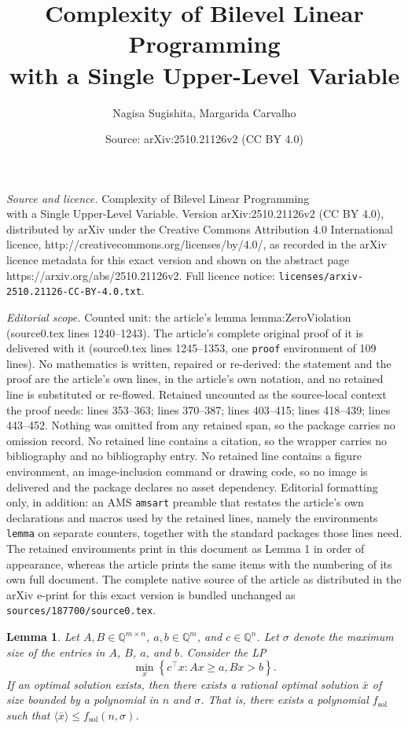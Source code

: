 \documentclass[10pt,a4paper]{amsart}
\title{Complexity of Bilevel Linear Programming\\with a Single Upper-Level Variable}
\author{Nagisa Sugishita, Margarida Carvalho}
\date{Source: arXiv:2510.21126v2 (CC BY 4.0)}
\newtheorem{lemma}{Lemma}
\newcommand{\ConstraintSense}{\MacroColor{\ge}}
\newcommand{\EncodingSize}{size}
\newcommand{\MacroColor}[1]{#1}
\newcommand{\NConstraints}{\MacroColor{m}}
\newcommand{\NVariables}{\MacroColor{n}}
\newcommand{\Size}[1]{\langle#1\rangle}
\newcommand{\SolutionSizeEstimate}{\MacroColor{f_{\mathrm{sol}}}}
\newcommand{\StrictConstraintSense}{\MacroColor{>}}
\begin{document}
\maketitle

\noindent\emph{Source and licence.} Complexity of Bilevel Linear Programming\\with a Single Upper-Level Variable. Version arXiv:2510.21126v2 (CC BY 4.0), distributed by arXiv under the Creative Commons Attribution 4.0 International licence, http://creativecommons.org/licenses/by/4.0/, as recorded in the arXiv licence metadata for this exact version and shown on the abstract page https://arxiv.org/abs/2510.21126v2. Full licence notice: \texttt{licenses/arxiv-2510.21126-CC-BY-4.0.txt}.\par\smallskip

\noindent\textit{Editorial scope.} Counted unit: the article's lemma lemma:ZeroViolation (source0.tex lines 1240--1243). The article's complete original proof of it is delivered with it (source0.tex lines 1245--1353, one \texttt{proof} environment of 109 lines). No mathematics is written, repaired or re-derived: the statement and the proof are the article's own lines, in the article's own notation, and no retained line is substituted or re-flowed.  Retained uncounted as the source-local context the proof needs: lines 353--363; lines 370--387; lines 403--415; lines 418--439; lines 443--452.  Nothing was omitted from any retained span, so the package carries no omission record.  No retained line contains a citation, so the wrapper carries no bibliography and no bibliography entry.  No retained line contains a figure environment, an image-inclusion command or drawing code, so no image is delivered and the package declares no asset dependency.  Editorial formatting only, in addition: an AMS \texttt{amsart} preamble that restates the article's own declarations and macros used by the retained lines, namely the environments \texttt{lemma} on separate counters, together with the standard packages those lines need.  The retained environments print in this document as Lemma 1 in order of appearance, whereas the article prints the same items with the numbering of its own full document.  The complete native source of the article as distributed in the arXiv e-print for this exact version is bundled unchanged as \texttt{sources/187700/source0.tex}.
\begin{lemma}
\label{lemma:estimate-of-primal-linear-inequality}
Let $A, B \in \mathbb{Q}^{\NConstraints \times \NVariables}$, $a, b \in \mathbb{Q}^{\NConstraints}$, and $c \in \mathbb{Q}^{\NVariables}$.  
Let $\sigma$ denote the maximum \EncodingSize{} of the entries in $A$, $B$, $a$, and $b$.  
Consider the LP
\[
\min_{x} \left\{ c^{\top} x : A x \ConstraintSense a, B x \StrictConstraintSense b \right\}.
\]
If an optimal solution exists, then there exists a rational optimal solution $\bar{x}$ of size bounded by a polynomial in $\NVariables$ and $\sigma$.  
That is, there exists a polynomial $\SolutionSizeEstimate$ such that $\Size{\bar{x}} \le \SolutionSizeEstimate(\NVariables, \sigma)$.
\end{lemma}
\end{document}
